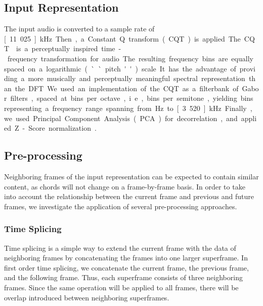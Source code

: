 \documentclass{article}
\begin{document}
\subsection{Input Representation}\label{sec:input}
The input audio is converted to a sample rate of \unit[11.025]{kHz}. Then, a Constant Q transform (CQT) is applied. 
The CQT \cite{brown1991calculation} is a perceptually inspired time-frequency transformation for audio. The resulting frequency bins are equally spaced on a logarithmic (``pitch'') scale. It has the advantage of providing a more musically and perceptually meaningful spectral representation than the DFT. 
We used an implementation of the CQT as a filterbank of Gabor filters, spaced at \unit[36]{bins per octave}, i.e., \unit[3]{bins per semitone}, yielding \unit[180]{bins} representing a frequency range spanning from \unit[110]{Hz} to \unit[3.520]{kHz}. Finally, we used Principal Component Analysis (PCA) for decorrelation, and applied Z-Score normalization\cite{sola1997importance}. 

\subsection{Pre-processing}\label{sec:pre-proc}
Neighboring frames of the input representation can be expected to contain similar content, as chords will not change on a frame-by-frame basis. In order to take into account the relationship between the current frame and previous and future frames, we investigate the application of several pre-processing approaches.

\subsubsection{Time Splicing}
Time splicing is a simple way to extend the current frame with the data of neighboring frames by concatenating the frames into one larger superframe. In first order time splicing, we concatenate the current frame, the previous frame, and the following frame. Thus, each superframe consists of three neighboring frames. Since the same operation will be applied to all frames, there will be overlap introduced between neighboring superframes. %
\end{document}
